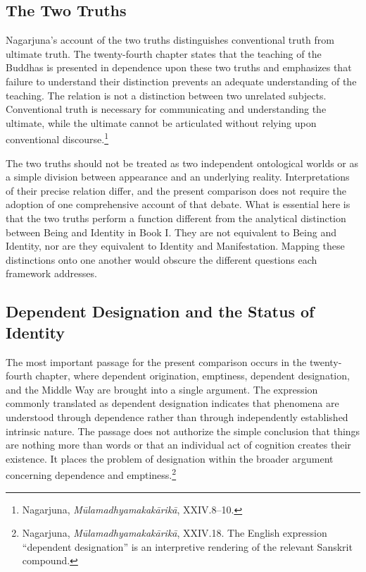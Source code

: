 \subsection{The Two Truths}
\label{subsec:ch08_s18_ss09}

\label{para:VS.B01.P01.C08.S18.SS09.P001}
Nagarjuna's account of the two truths distinguishes conventional truth from ultimate truth. The twenty-fourth chapter states that the teaching of the Buddhas is presented in dependence upon these two truths and emphasizes that failure to understand their distinction prevents an adequate understanding of the teaching. The relation is not a distinction between two unrelated subjects. Conventional truth is necessary for communicating and understanding the ultimate, while the ultimate cannot be articulated without relying upon conventional discourse.\footnote{Nagarjuna, \emph{M\={u}lamadhyamakak\={a}rik\={a}}, XXIV.8--10.}


\label{para:VS.B01.P01.C08.S18.SS09.P002}
The two truths should not be treated as two independent ontological worlds or as a simple division between appearance and an underlying reality. Interpretations of their precise relation differ, and the present comparison does not require the adoption of one comprehensive account of that debate. What is essential here is that the two truths perform a function different from the analytical distinction between Being and Identity in Book I. They are not equivalent to Being and Identity, nor are they equivalent to Identity and Manifestation. Mapping these distinctions onto one another would obscure the different questions each framework addresses.

\subsection{Dependent Designation and the Status of Identity}
\label{subsec:ch08_s18_ss10}

\label{para:VS.B01.P01.C08.S18.SS10.P001}
The most important passage for the present comparison occurs in the twenty-fourth chapter, where dependent origination, emptiness, dependent designation, and the Middle Way are brought into a single argument. The expression commonly translated as dependent designation indicates that phenomena are understood through dependence rather than through independently established intrinsic nature. The passage does not authorize the simple conclusion that things are nothing more than words or that an individual act of cognition creates their existence. It places the problem of designation within the broader argument concerning dependence and emptiness.\footnote{Nagarjuna, \emph{M\={u}lamadhyamakak\={a}rik\={a}}, XXIV.18. The English expression ``dependent designation'' is an interpretive rendering of the relevant Sanskrit compound.}

